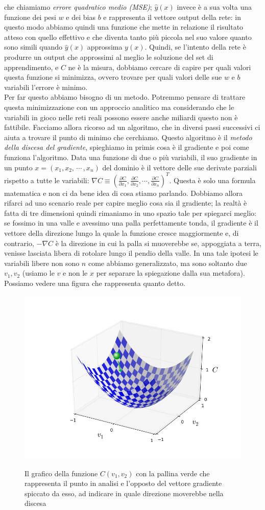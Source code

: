 che chiamiamo \textit{errore quadratico medio (MSE)}; $\hat{y}(x)$ invece è a sua volta una funzione dei pesi $w$ e dei bias $b$ e rappresenta il vettore output della rete: in questo modo abbiamo quindi una funzione che mette in relazione il risultato atteso con quello effettivo e che diventa tanto più piccola nel suo valore quanto sono simili quando $\hat{y}(x)$ approssima $y(x)$. Quindi, se l'intento della rete è produrre un output che approssimi al meglio le soluzione del set di apprendimento, e $C$ ne è la misura, dobbiamo cercare di capire per quali valori questa funzione si minimizza, ovvero trovare per quali valori delle sue $w$ e $b$ variabili l'errore è minimo. 
\\
Per far questo abbiamo bisogno di un metodo. Potremmo pensare di trattare questa minimizzazione con un approccio analitico ma considerando che le variabili in gioco nelle reti reali possono essere anche miliardi questo non è fattibile. 
Facciamo allora ricorso ad un algoritmo, che in diversi passi successivi ci aiuta a trovare il punto di minimo che cerchiamo. Questo algoritmo è il \textit{metodo della discesa del gradiente}, spieghiamo in primis cosa è il gradiente e poi come funziona l'algoritmo.
Data una funzione di due o più variabili, il suo gradiente in un punto $x=(x_{1}, x_{2},\, \cdots \, , x_{n})$ del dominio è il vettore delle sue derivate parziali rispetto a tutte le variabili: $\nabla C \equiv (\frac{\partial C}{\partial x_{1}}, \frac{\partial C}{\partial x_{2}}, \cdots, \frac{\partial C}{\partial x_{n}})^{T}$. Questa è solo una formula matematica e non ci da bene idea di cosa stiamo parlando. Dobbiamo allora rifarci ad uno scenario reale per capire meglio cosa sia il gradiente; la realtà è fatta di tre dimensioni quindi rimaniamo in uno spazio tale per spiegarci meglio: se fossimo in una valle e avessimo una palla perfettamente tonda, il gradiente è il vettore della direzione lungo la quale la funzione cresce maggiormente e, di contrario, $-\nabla C$ è la direzione in cui la palla si muoverebbe se, appoggiata a terra, venisse lasciata libera di rotolare lungo il pendio della valle. In una tale ipotesi le variabili libere non sono $n$ come abbiamo generalizzato, ma sono soltanto due $v_{1}, v_{2}$ (usiamo le $v$ e non le $x$ per separare la spiegazione dalla sua metafora). Possiamo vedere una figura che rappresenta quanto detto.

\begin{figure}[hbtb]
\centering
{\includegraphics[width=.45\textwidth]{media_tesi/valley_with_ball.png}}
\caption{Il grafico della funzione $C(v_{1}, v_{2})$ con la pallina verde che rappresenta il punto in analisi e l'opposto del vettore gradiente spiccato da esso, ad indicare in quale direzione moverebbe nella discesa}
\label{fig:subfig}
\end{figure}

